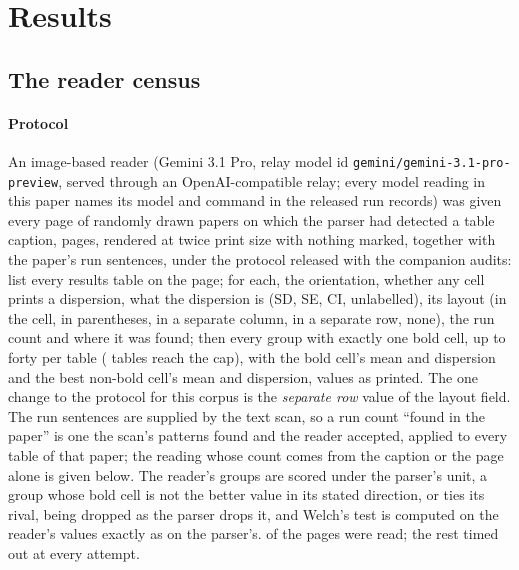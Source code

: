\documentclass[preprint,review,12pt]{elsarticle}
\begin{document}
\section{Results}
\label{sec:results}

\subsection{The reader census}
\label{sec:census}

\paragraph{Protocol} An image-based reader (Gemini 3.1 Pro, relay model id \texttt{gemini/}\allowbreak\texttt{gemini-3.1-pro-preview}, served through an OpenAI-compatible relay; every model reading in this paper names its model and command in the released run records) was given every page of \nCzPapersDrawn{} randomly drawn papers on which the parser had detected a table caption, \nCzPagesDrawn{} pages, rendered at twice print size with nothing marked, together with the paper's run sentences, under the protocol released with the companion audits: list every results table on the page; for each, the orientation, whether any cell prints a dispersion, what the dispersion is (SD, SE, CI, unlabelled), its layout (in the cell, in parentheses, in a separate column, in a separate row, none), the run count and where it was found; then every group with exactly one bold cell, up to forty per table (\nCrcTablesAtGroupCap{} tables reach the cap), with the bold cell's mean and dispersion and the best non-bold cell's mean and dispersion, values as printed. The one change to the protocol for this corpus is the \emph{separate row} value of the layout field. The run sentences are supplied by the text scan, so a run count ``found in the paper'' is one the scan's patterns found and the reader accepted, applied to every table of that paper; the reading whose count comes from the caption or the page alone is given below. The reader's groups are scored under the parser's unit, a group whose bold cell is not the better value in its stated direction, or ties its rival, being dropped as the parser drops it, and Welch's test is computed on the reader's values exactly as on the parser's. \nCzPagesRead{} of the \nCzPagesDrawn{} pages were read; the rest timed out at every attempt.
\end{document}
